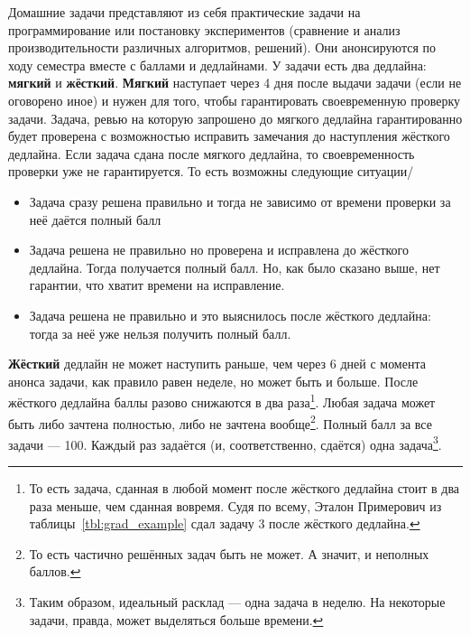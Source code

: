 Домашние задачи представляют из себя практические задачи на программирование или постановку экспериментов (сравнение и анализ производительности различных алгоритмов, решений).
Они анонсируются по ходу семестра вместе с баллами и дедлайнами.
У задачи есть два дедлайна: \textbf{мягкий} и \textbf{жёсткий}.
\textbf{Мягкий} наступает через 4 дня после выдачи задачи (если не оговорено иное) и нужен для того, чтобы гарантировать своевременную проверку задачи.
Задача, ревью на которую запрошено до мягкого дедлайна гарантированно будет проверена с возможностью исправить замечания до наступления жёсткого дедлайна. Если задача сдана после мягкого дедлайна, то своевременность проверки уже не гарантируется. То есть возможны следующие ситуации/
\begin{itemize}
    \item Задача сразу решена правильно и тогда не зависимо от времени проверки за неё даётся полный балл
    \item Задача решена не правильно но проверена и исправлена до жёсткого дедлайна. Тогда получается полный балл. Но, как было сказано выше, нет гарантии, что хватит времени на исправление.
    \item Задача решена не правильно и это выяснилось после жёсткого дедлайна: тогда за неё уже нельзя получить полный балл.
\end{itemize}
\textbf{Жёсткий} дедлайн не может наступить раньше, чем через 6 дней с момента анонса задачи, как правило равен неделе, но может быть и больше. После жёсткого дедлайна баллы разово снижаются в два раза\footnote{То есть задача, сданная в любой момент после жёсткого дедлайна стоит в два раза меньше, чем сданная вовремя. Судя по всему, Эталон Примерович из таблицы~\ref{tbl:grad_example} сдал задачу 3 после жёсткого дедлайна.}. Любая задача может быть либо зачтена полностью, либо не зачтена вообще\footnote{То есть частично решённых задач быть не может. А значит, и неполных баллов.}. Полный балл за все задачи --- 100.
Каждый раз задаётся (и, соответственно, сдаётся) одна задача\footnote{Таким образом, идеальный расклад --- одна задача в неделю. На некоторые задачи, правда, может выделяться больше времени.}.


